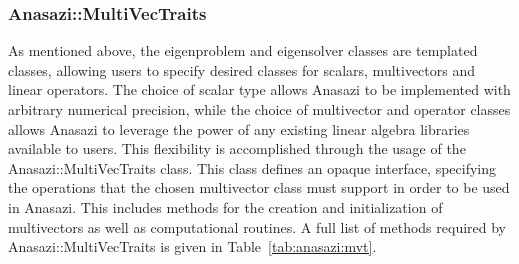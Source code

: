 \subsubsection{Anasazi::MultiVecTraits}
\label{sec:anasazi:mvt}

As mentioned above, the eigenproblem and eigensolver classes are templated
classes, allowing users to specify desired classes for scalars, multivectors
and linear operators. The choice of scalar type allows Anasazi to be implemented
with arbitrary numerical precision, while the choice of multivector and operator
classes allows Anasazi to leverage the power of any existing linear algebra
libraries available to users. This flexibility is accomplished through the
usage of the Anasazi::MultiVecTraits class. This class defines an opaque
interface, specifying the operations that the chosen multivector class must
support in order to be used in Anasazi. This includes methods for the creation
and initialization of multivectors as well as computational routines. A full
list of methods required by Anasazi::MultiVecTraits is given in
Table~\ref{tab:anasazi:mvt}.

